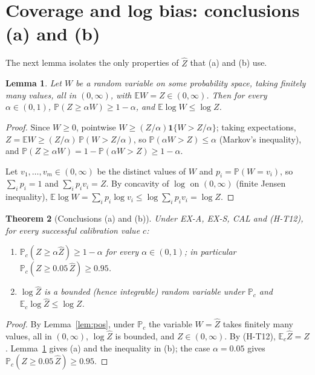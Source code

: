 \documentclass[11pt]{article}
\newtheorem{theorem}{Theorem}
\newtheorem{lemma}[theorem]{Lemma}
\theoremstyle{remark}
\newcommand{\Zh}{\widehat Z}
\newcommand{\Pc}{\mathbb{P}_c}
\newcommand{\Ec}{\mathbb{E}_c}
\begin{document}
\section{Coverage and log bias: conclusions (a) and (b)}

The next lemma isolates the only properties of $\Zh$ that (a) and (b) use.

\begin{lemma}\label{lem:core}
Let $W$ be a random variable on some probability space, taking finitely many values, all in $(0,\infty)$, with
$\mathbb{E}W=Z\in(0,\infty)$. Then for every $\alpha\in(0,1)$, $\mathbb{P}(Z\ge\alpha W)\ge1-\alpha$, and
$\mathbb{E}\log W\le\log Z$.
\end{lemma}

\begin{proof}
Since $W\ge0$, pointwise $W\ge (Z/\alpha)\mathbf 1\{W>Z/\alpha\}$; taking expectations,
$Z=\mathbb{E}W\ge(Z/\alpha)\,\mathbb{P}(W>Z/\alpha)$, so $\mathbb{P}(\alpha W>Z)\le\alpha$ (Markov's inequality), and
$\mathbb{P}(Z\ge\alpha W)=1-\mathbb{P}(\alpha W>Z)\ge1-\alpha$.

Let $v_1,\dots,v_m\in(0,\infty)$ be the distinct values of $W$ and $p_i=\mathbb{P}(W=v_i)$, so $\sum_ip_i=1$ and
$\sum_ip_iv_i=Z$. By concavity of $\log$ on $(0,\infty)$ (finite Jensen inequality),
$\mathbb{E}\log W=\sum_ip_i\log v_i\le\log\sum_ip_iv_i=\log Z$.
\end{proof}

\begin{theorem}[Conclusions (a) and (b)]\label{thm:ab}
Under EX-A, EX-S, CAL and (H-T12), for every successful calibration value $c$:
\begin{enumerate}[label=(\alph*)]
\item $\Pc(Z\ge\alpha\Zh)\ge1-\alpha$ for every $\alpha\in(0,1)$; in particular $\Pc(Z\ge0.05\,\Zh)\ge0.95$.
\item $\log\Zh$ is a bounded (hence integrable) random variable under $\Pc$ and $\Ec\log\Zh\le\log Z$.
\end{enumerate}
\end{theorem}

\begin{proof}
By Lemma~\ref{lem:pos}, under $\Pc$ the variable $W=\Zh$ takes finitely many values, all in $(0,\infty)$, $\log\Zh$ is
bounded, and $Z\in(0,\infty)$. By (H-T12), $\Ec\Zh=Z$. Lemma~\ref{lem:core} gives (a) and the inequality in (b); the case
$\alpha=0.05$ gives $\Pc(Z\ge0.05\,\Zh)\ge0.95$.
\end{proof}
\end{document}
